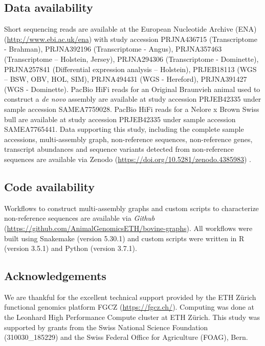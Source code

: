 \documentclass[../main.tex]{subfiles}
\begin{document}
\subsection*{Data availability}

Short sequencing reads are available at the European Nucleotide Archive (ENA) (\url{http://www.ebi.ac.uk/ena}) with study accession PRJNA436715 (Transcriptome - Brahman), PRJNA392196 (Transcriptome - Angus), PRJNA357463 (Transcriptome – Holstein, Jersey), PRJNA294306 (Transcriptome - Dominette), PRJNA257841 (Differential expression analysis – Holstein), PRJEB18113 (WGS – BSW, OBV, HOL, SIM), PRJNA494431 (WGS - Hereford), PRJNA391427 (WGS - Dominette). PacBio HiFi reads for an Original Braunvieh animal used to construct a \emph{de novo} assembly are available at study accession PRJEB42335 under sample accession SAMEA7759028. PacBio HiFi reads for a Nelore x Brown Swiss bull are available at study accession PRJEB42335 under sample accession SAMEA7765441. Data supporting this study, including the complete sample accessions, multi-assembly graph, non-reference sequences, non-reference genes, transcript abundances and sequence variants detected from non-reference sequences are available via Zenodo (\url{https://doi.org/10.5281/zenodo.4385983}) \citep{Crysnanto2021}. 

\subsection*{Code availability}

Workflows to construct multi-assembly graphs and custom scripts to characterize non-reference sequences are available via \emph{Github} (\url{https://github.com/AnimalGenomicsETH/bovine-graphs}). All workflows were built using Snakemake (version 5.30.1) \citep{koster2012snakemake} and custom scripts were written in R (version 3.5.1) \citep{RCoreTeam2017} and Python (version 3.7.1). 

\subsection*{Acknowledgements}

We are thankful for the excellent technical support provided by the ETH Zürich functional genomics platform FGCZ (\url{https://fgcz.ch/}). Computing was done at the Leonhard High Performance Compute cluster at ETH Zürich. This study was supported by grants from the Swiss National Science Foundation (310030\_185229) and the Swiss Federal Office for Agriculture (FOAG), Bern.

\vspace{-2em}

\singlespacing
\footnotesize

\renewcommand{\bibname}{References \vspace{-1em}}



\ifdefined\BuildingFromMainFile
\else
   
\end{document}
